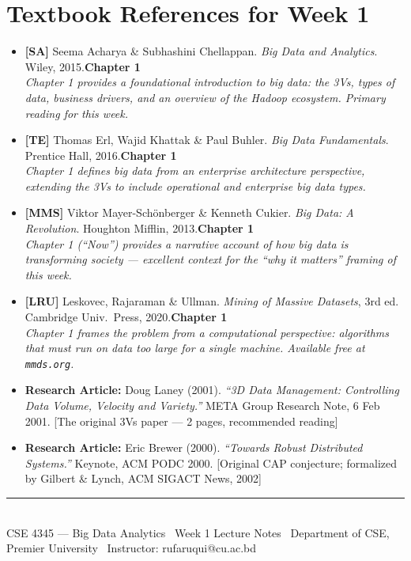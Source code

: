 \documentclass[12pt,a4paper]{article}
\begin{document}
\section*{Textbook References for Week 1}

\begin{itemize}[leftmargin=2em, itemsep=6pt]
  \item \textbf{[SA]} Seema Acharya \& Subhashini Chellappan. \textit{Big Data and Analytics}. Wiley, 2015.\hfill\textbf{Chapter 1}\\
        \small\textit{Chapter 1 provides a foundational introduction to big data: the 3Vs, types of data, business drivers, and an overview of the Hadoop ecosystem. Primary reading for this week.}

  \item \textbf{[TE]} Thomas Erl, Wajid Khattak \& Paul Buhler. \textit{Big Data Fundamentals}. Prentice Hall, 2016.\hfill\textbf{Chapter 1}\\
        \small\textit{Chapter 1 defines big data from an enterprise architecture perspective, extending the 3Vs to include operational and enterprise big data types.}

  \item \textbf{[MMS]} Viktor Mayer-Schönberger \& Kenneth Cukier. \textit{Big Data: A Revolution}. Houghton Mifflin, 2013.\hfill\textbf{Chapter 1}\\
        \small\textit{Chapter 1 (``Now'') provides a narrative account of how big data is transforming society — excellent context for the ``why it matters'' framing of this week.}

  \item \textbf{[LRU]} Leskovec, Rajaraman \& Ullman. \textit{Mining of Massive Datasets}, 3rd ed. Cambridge Univ.\ Press, 2020.\hfill\textbf{Chapter 1}\\
        \small\textit{Chapter 1 frames the problem from a computational perspective: algorithms that must run on data too large for a single machine. Available free at \texttt{mmds.org}.}

  \item \textbf{Research Article:} Doug Laney (2001). \textit{``3D Data Management: Controlling Data Volume, Velocity and Variety.''} META Group Research Note, 6 Feb 2001. [The original 3Vs paper — 2 pages, recommended reading]

  \item \textbf{Research Article:} Eric Brewer (2000). \textit{``Towards Robust Distributed Systems.''} Keynote, ACM PODC 2000. [Original CAP conjecture; formalized by Gilbert \& Lynch, ACM SIGACT News, 2002]
\end{itemize}

\vspace{12pt}
\noindent\rule{\linewidth}{0.8pt}\\[4pt]
{\small\textcolor{PUGray}{CSE 4345 — Big Data Analytics \textbar\ Week 1 Lecture Notes \textbar\
Department of CSE, Premier University \textbar\ Instructor: rufaruqui@cu.ac.bd}}
\end{document}
